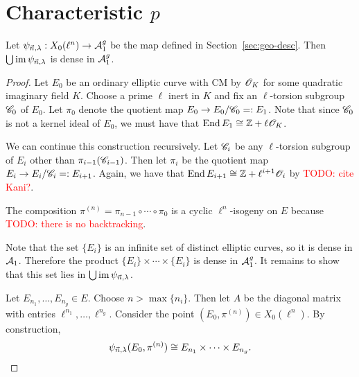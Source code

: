 \documentclass{amsart}
\begin{document}
\section{Characteristic $p$}
\label{sec:characteristic-p}

\begin{theorem}
  Let $\psi_{\vec{n},\lambda}: X_0(\ell^n) \to \mathcal{A}_1^g$ be the map defined in Section~\ref{sec:geo-desc}. Then $\bigcup\operatorname{im}\psi_{\vec{n},\lambda}$ is dense in $\mathcal{A}_1^g$.
\end{theorem}
\begin{proof}
  Let $E_0$ be an ordinary elliptic curve with CM by $\mathscr{O}_K$ for some quadratic imaginary field $K$. Choose a prime $\ell$ inert in $K$ and fix an $\ell$-torsion subgroup $\mathscr{C}_0$ of $E_0$. Let $\pi_0$ denote the quotient map $E_0 \to E_0/\mathscr{C}_0 =: E_1$. Note that since $\mathscr{C}_0$ is not a kernel ideal of $E_0$, we must have that $\operatorname{End} E_1 \cong \mathbb{Z} + \ell\mathscr{O}_K$.

  We can continue this construction recursively. Let $\mathscr{C}_i$ be any $\ell$-torsion subgroup of $E_i$ other than $\pi_{i-1}(\mathscr{C}_{i-1})$. Then let $\pi_i$ be the quotient map $E_i \to E_i/\mathscr{C}_i =: E_{i+1}$. Again, we have that $\operatorname{End} E_{i+1} \cong \mathbb{Z} + \ell^{i+1}\mathscr{O}_{i}$ by \textcolor{red}{TODO: cite Kani?}.

  The composition $\pi^{(n)} = \pi_{n-1} \circ \cdots \circ \pi_0$ is a cyclic $\ell^n$-isogeny on $E$ because \textcolor{red}{TODO: there is no backtracking}.

  Note that the set $\{E_i\}$ is an infinite set of distinct elliptic curves, so it is dense in $\mathcal{A}_1$. Therefore the product $\{E_i\} \times \cdots \times \{E_i\}$ is dense in $\mathcal{A}_1^g$. It remains to show that this set lies in $\bigcup\operatorname{im}\psi_{\vec{n},\lambda}$.

  Let $E_{n_1},\dots,E_{n_g} \in E$. Choose $n > \max\{n_i\}$. Then let $A$ be the diagonal matrix with entries $\ell^{n_1},\dots,\ell^{n_g}$. Consider the point $(E_0,\pi^{(n)}) \in X_0(\ell^n)$. By construction,
  \[
    \psi_{\vec{n},\lambda}(E_0,\pi^{(n)}) \cong E_{n_1} \times \cdots \times E_{n_g}.
  \]
\end{proof}






\end{document}
